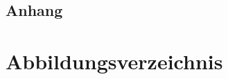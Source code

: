 \documentclass[12pt,a4paper,bibliography=totoc,listof=totoc]{scrartcl}
\begin{document}
\begin{appendix}
\section*{Anhang}
{}


\end{appendix}

\section {Abbildungsverzeichnis}
\listoffigures
\pagebreak

\listoftables
\pagebreak


\renewcommand\refname{Literaturverzeichnis}
\lhead{}
%


\pagebreak
\end{document}
